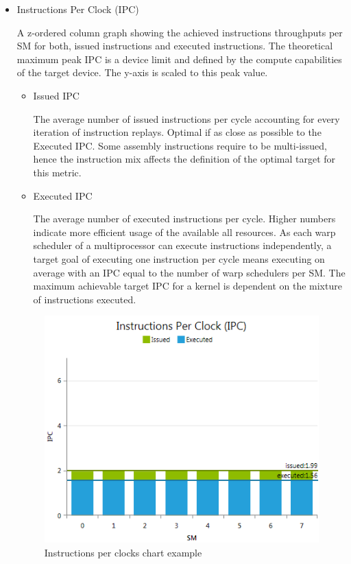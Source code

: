 \documentclass[oneside,openright,12pt,final,en]{mgr}
\begin{document}
\begin{itemize}	
	\item Instructions Per Clock (IPC)
	
	A z-ordered column graph showing the achieved instructions throughputs per SM for both, issued instructions and executed instructions. The theoretical maximum peak IPC is a device limit and defined by the compute capabilities of the target device. The y-axis is scaled to this peak value.
	\begin{itemize}	
		\item Issued IPC
		
		The average number of issued instructions per cycle accounting for every iteration of instruction replays. Optimal if as close as possible to the Executed IPC. Some assembly instructions require to be multi-issued, hence the instruction mix affects the definition of the optimal target for this metric.
	
		\item Executed IPC
		
		The average number of executed instructions per cycle. Higher numbers indicate more efficient usage of the available all resources. As each warp scheduler of a multiprocessor can execute instructions independently, a target goal of executing one instruction per cycle means executing on average with an IPC equal to the number of warp schedulers per SM. The maximum achievable target IPC for a kernel is dependent on the mixture of instructions executed.		
		
	\end{itemize}

	\begin{figure}[h!]
		\centering
		\includegraphics{InstructionStatisticsChartInstructionsPerClock}
		\caption{Instructions per clocks chart example}
	\end{figure}


\end{itemize}
\end{document}
